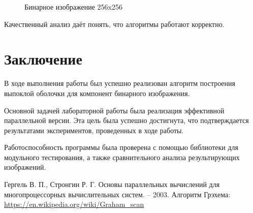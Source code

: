 \documentclass{report}
\begin{document}
\begin{figure}[H]
\caption{Бинарное изображение 256x256}
\end{figure}





\par
Качественный анализ даёт понять, что алгоритмы работают корректно.

\newpage

\section*{Заключение}
В ходе выполнения работы был успешно реализован алгоритм построения выпоклой оболочки для компонент бинарного изображения.
\par 
Основной задачей лабораторной работы была реализация эффективной параллельной версии. Эта цель была успешно достигнута, что подтверждается результатами экспериментов, проведенных в ходе работы. 
\par 
Работоспособность программы была проверена с помощью библиотеки для модульного тестирования, а также сравнительного анализа результирующих изображений.
\newpage

\begin{thebibliography}{1}
Гергель В. П., Стронгин Р. Г. Основы параллельных вычислений для многопроцессорных вычислительных систем. – 2003.
Алгоритм Грэхема: \url {https://en.wikipedia.org/wiki/Graham_scan }
\end{thebibliography}
\newpage

\end{document}
